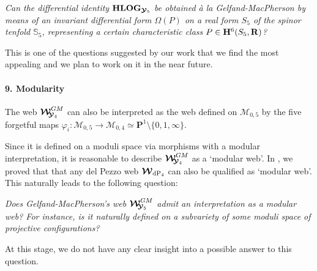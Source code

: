 \documentclass[11pt]{amsart}
\newcommand{\sk}{\smallskip}
\newcommand{\mk}{\medskip}
\begin{document}
 {\it Can the differential identity 
${\bf HLOG}_{\boldsymbol{\mathcal Y}_5}$ be
obtained \`a la Gelfand-MacPherson by means of an invariant
differential form $\Omega(P)$ on a real form $S_5$ of the spinor tenfold $\mathbb S_5$, representing a certain characteristic class 
$P\in {\bf H}^6(  S_5,\mathbf R)$?} 
\sk 


This is one of the questions suggested by our work that we find the most appealing and we plan to work on it in the near future. 
\mk 



\paragraph{\bf 9. Modularity}
 The web $\boldsymbol{\mathcal W}_{\hspace{-0.1cm} \boldsymbol{\mathcal Y}_4}^{GM}$  can also be interpreted as the web defined on $\mathcal{M}_{0,5}$ by the five forgetful maps $\varphi_i : \mathcal M_{0,5}\rightarrow \mathcal M_{0,4}\simeq \mathbf P^1\setminus \{0,1,\infty\}$. 
 
Since it is defined on a moduli space via morphisms with a modular interpretation, it is reasonable to describe $\boldsymbol{\mathcal W}_{\hspace{-0.1cm} \boldsymbol{\mathcal Y}_4}^{GM}$ as a `modular web'. 
 In \cite[\S4.6]{PirioAFST}, we proved that that any del Pezzo web 
$\boldsymbol{\mathcal W}_{ {\rm dP}_4}$ can also be qualified as `modular web'.
This naturally leads to the following question: 
 
 
 

 {\it Does Gelfand-MacPherson's web $\boldsymbol{\mathcal W}_{\hspace{-0.1cm} \boldsymbol{\mathcal Y}_5}^{GM}$ 
admit an interpretation as a modular web? For instance, is it naturally defined on a subvariety of some moduli space of projective configurations?} 
\sk 

At this stage, we do not have any clear insight into a possible answer to this question.
\mk 


\end{document}
